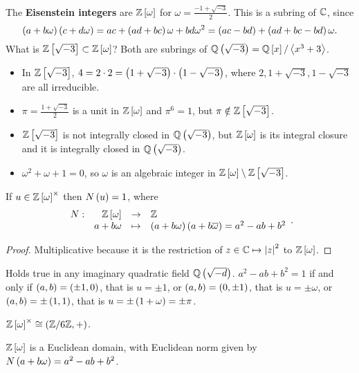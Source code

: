 The \textbf{Eisenstein integers} are $ \mathbb{Z}\left[ \omega \right] $ for $ \omega = \tfrac{-1 + \sqrt{-3}}{2} $. This is a subring of $ \mathbb{C} $, since
$$ \left( a + b\omega \right)\left( c + d\omega \right) = ac + \left( ad + bc \right)\omega + bd\omega^2 = \left( ac - bd \right) + \left( ad + bc - bd \right)\omega. $$
What is $ \mathbb{Z}\left[ \sqrt{-3} \right] \subset \mathbb{Z}\left[ \omega \right] $? Both are subrings of $ \mathbb{Q}\left( \sqrt{-3} \right) = \mathbb{Q}\left[ x \right] / \left\langle x^3 + 3 \right\rangle $.
\begin{itemize}
\item In $ \mathbb{Z}\left[ \sqrt{-3} \right] $, $ 4 = 2 \cdot 2 = \left( 1 + \sqrt{-3} \right) \cdot \left( 1 - \sqrt{-3} \right) $, where $ 2, 1 + \sqrt{-3}, 1 - \sqrt{-3} $ are all irreducible.
\item $ \pi = \tfrac{1 + \sqrt{-3}}{2} $ is a unit in $ \mathbb{Z}\left[ \omega \right] $ and $ \pi^6 = 1 $, but $ \pi \notin \mathbb{Z}\left[ \sqrt{-3} \right] $.
\item $ \mathbb{Z}\left[ \sqrt{-3} \right] $ is not integrally closed in $ \mathbb{Q}\left( \sqrt{-3} \right) $, but $ \mathbb{Z}\left[ \omega \right] $ is its integral closure and it is integrally closed in $ \mathbb{Q}\left( \sqrt{-3} \right) $.
\item $ \omega^2 + \omega + 1 = 0 $, so $ \omega $ is an algebraic integer in $ \mathbb{Z}\left[ \omega \right] \setminus \mathbb{Z}\left[ \sqrt{-3} \right] $.
\end{itemize}

\begin{proposition}
If $ u \in \mathbb{Z}\left[ \omega \right]^\times $ then $ N\left( u \right) = 1 $, where
$$ \function[N]{\Z\sb{\omega}}{\Z}{a + b\omega}{\rb{a + b\omega}\rb{a + b\overline{\omega}} = a^2 - ab + b^2}. $$
\end{proposition}

\begin{proof}
Multiplicative because it is the restriction of $ z \in \mathbb{C} \mapsto \left\lvert z \right\rvert^2 $ to $ \mathbb{Z}\left[ \omega \right] $.
\end{proof}

Holds true in any imaginary quadratic field $ \mathbb{Q}\left( \sqrt{-d} \right) $. $ a^2 - ab + b^2 = 1 $ if and only if $ \left( a, b \right) = \left( \pm 1, 0 \right) $, that is $ u = \pm 1 $, or $ \left( a, b \right) = \left( 0, \pm 1 \right) $, that is $ u = \pm \omega $, or $ \left( a, b \right) = \pm\left( 1, 1 \right) $, that is $ u = \pm\left( 1 + \omega \right) = \pm\pi $.

\begin{remark*}
$ \mathbb{Z}\left[ \omega \right]^\times \cong \left( \mathbb{Z} / 6\mathbb{Z}, + \right) $.
\end{remark*}

\begin{theorem}
$ \mathbb{Z}\left[ \omega \right] $ is a Euclidean domain, with Euclidean norm given by $ N\left( a + b\omega \right) = a^2 - ab + b^2 $.
\end{theorem}

